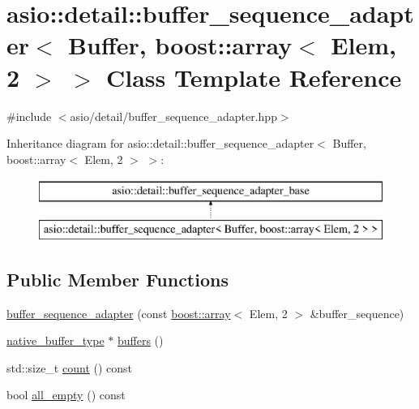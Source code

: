 \hypertarget{classasio_1_1detail_1_1buffer__sequence__adapter_3_01_buffer_00_01boost_1_1array_3_01_elem_00_012_01_4_01_4}{}\section{asio\+:\+:detail\+:\+:buffer\+\_\+sequence\+\_\+adapter$<$ Buffer, boost\+:\+:array$<$ Elem, 2 $>$ $>$ Class Template Reference}
\label{classasio_1_1detail_1_1buffer__sequence__adapter_3_01_buffer_00_01boost_1_1array_3_01_elem_00_012_01_4_01_4}


{\ttfamily \#include $<$asio/detail/buffer\+\_\+sequence\+\_\+adapter.\+hpp$>$}

Inheritance diagram for asio\+:\+:detail\+:\+:buffer\+\_\+sequence\+\_\+adapter$<$ Buffer, boost\+:\+:array$<$ Elem, 2 $>$ $>$\+:\begin{figure}[H]
\begin{center}
\leavevmode
\includegraphics[height=2.000000cm]{classasio_1_1detail_1_1buffer__sequence__adapter_3_01_buffer_00_01boost_1_1array_3_01_elem_00_012_01_4_01_4}
\end{center}
\end{figure}
\subsection*{Public Member Functions}
\begin{DoxyCompactItemize}
\item 
\hyperlink{classasio_1_1detail_1_1buffer__sequence__adapter_3_01_buffer_00_01boost_1_1array_3_01_elem_00_012_01_4_01_4_aa1ffc7826198838ad79f17fd9b7fe580}{buffer\+\_\+sequence\+\_\+adapter} (const \hyperlink{classboost_1_1array}{boost\+::array}$<$ Elem, 2 $>$ \&buffer\+\_\+sequence)
\item 
\hyperlink{classasio_1_1detail_1_1buffer__sequence__adapter__base_a91d037bd052777b8df514e6b94ec9e71}{native\+\_\+buffer\+\_\+type} $\ast$ \hyperlink{classasio_1_1detail_1_1buffer__sequence__adapter_3_01_buffer_00_01boost_1_1array_3_01_elem_00_012_01_4_01_4_a53cb0025addcbf70bf5318dc6ed1af9d}{buffers} ()
\item 
std\+::size\+\_\+t \hyperlink{classasio_1_1detail_1_1buffer__sequence__adapter_3_01_buffer_00_01boost_1_1array_3_01_elem_00_012_01_4_01_4_a0e3a0d4b2706eaec1a89c0ad06bf38e2}{count} () const 
\item 
bool \hyperlink{classasio_1_1detail_1_1buffer__sequence__adapter_3_01_buffer_00_01boost_1_1array_3_01_elem_00_012_01_4_01_4_a8e662f41738e0a9728e48f0ddc8b17cf}{all\+\_\+empty} () const 
\end{DoxyCompactItemize}
